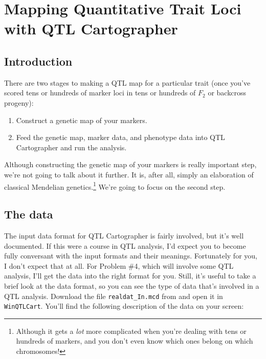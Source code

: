 \chapter{Mapping Quantitative Trait Loci with QTL Cartographer}

\section*{Introduction}

There are two stages to making a QTL map for a particular trait
(once you've scored tens or hundreds of marker loci in tens or
hundreds of $F_2$ or backcross progeny):

\begin{enumerate}

\item Construct a genetic map of your markers.

\item Feed the genetic map, marker data, and phenotype data into QTL
Cartographer and run the analysis.

\end{enumerate}

\noindent Although constructing the genetic map of your markers is
really important step, we're not going to talk about it further. It
is, after all, simply an elaboration of classical Mendelian
genetics.\footnote{Although it gets a {\it lot\/} more complicated
  when you're dealing with tens or hundreds of markers, and you don't
  even know which ones belong on which chromosomes!} We're going to
focus on the second step.

\section*{The data}

The input data format for QTL Cartographer is fairly involved, but
it's well documented. If this were a course in QTL analysis, I'd
expect you to become fully conversant with the input formats and their
meanings. Fortunately for you, I don't expect that at all. For Problem
\#4, which will involve some QTL analysis, I'll get the data into the
right format for you. Still, it's useful to take a brief look at the
data format, so you can see the type of data that's involved in a QTL
analysis. Download the file {\tt realdat\_In.mcd} from
and open it in {\tt WinQTLCart}. You'll find the following description
of the data on your screen:

